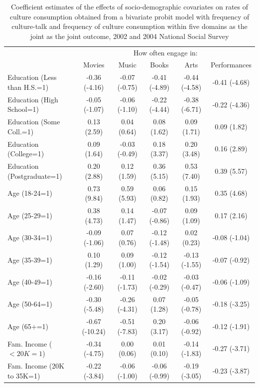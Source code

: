 \documentclass[11pt]{article}
\begin{document}
\begin{table}[t]
\caption{Coefficient estimates of the effects of socio-demographic covariates on rates of culture consumption obtained from a bivariate probit model with frequency of culture-talk and frequency of culture consumption within five domains as the joint as the joint outcome, 2002 and 2004 National Social Survey}
\begin{tabular*}{\hsize}{@{\extracolsep{\fill}} l*{5}{c}}
\hline
\hline
&\multicolumn{5}{c}{How often engage in:}\\
&Movies&Music&Books&Arts&Performances\\
\hline
Education (Less than H.S.=1)  &-0.36 (-4.16)&-0.07 (-0.75)&-0.41 (-4.89)&-0.44 (-4.58)&-0.41 (-4.68)\\
Education (High School=1)     &-0.05 (-1.07)&-0.06 (-1.10)&-0.22 (-4.44)&-0.38 (-6.71)&-0.22 (-4.36)\\
Education (Some Coll.=1)      &0.13 (2.59)&0.04 (0.64)&0.08 (1.62)&0.09 (1.71)&0.09 (1.82)\\
Education (College=1)         &0.09 (1.64)&-0.03 (-0.49)&0.18 (3.37)&0.20 (3.48)&0.16 (2.89)\\
Education (Postgraduate=1)    &0.20 (2.88)&0.12 (1.59)&0.36 (5.15)&0.53 (7.40)&0.39 (5.57)\\
Age (18-24=1)                 &0.73 (9.84)&0.59 (5.93)&0.06 (0.82)&0.15 (1.93)&0.35 (4.68)\\
Age (25-29=1)                 &0.38 (4.73)&0.14 (1.47)&-0.07 (-0.86)&0.09 (1.09)&0.17 (2.16)\\
Age (30-34=1)                 &-0.09 (-1.06)&0.07 (0.76)&-0.12 (-1.48)&0.02 (0.23)&-0.08 (-1.04)\\
Age (35-39=1)                 &0.10 (1.29)&0.09 (1.00)&-0.12 (-1.54)&-0.13 (-1.55)&-0.07 (-0.92)\\
Age (40-49=1)                 &-0.16 (-2.60)&-0.11 (-1.73)&-0.02 (-0.29)&-0.03 (-0.47)&-0.06 (-1.09)\\
Age (50-64=1)                 &-0.30 (-5.48)&-0.26 (-4.31)&0.07 (1.28)&-0.05 (-0.78)&-0.18 (-3.25)\\
Age (65+=1)                   &-0.67 (-10.24)&-0.51 (-7.83)&0.20 (3.17)&-0.06 (-0.92)&-0.12 (-1.91)\\
Fam. Income ($<20K=1$)          &-0.34 (-4.75)&0.00 (0.06)&0.01 (0.10)&-0.14 (-1.83)&-0.27 (-3.71)\\
Fam. Income (20K to 35K=1)   &-0.22 (-3.84)&-0.06 (-1.00)&-0.06 (-0.99)&-0.19 (-3.05)&-0.23 (-3.87)\\

\end{tabular*}
\end{table}
\end{document}
